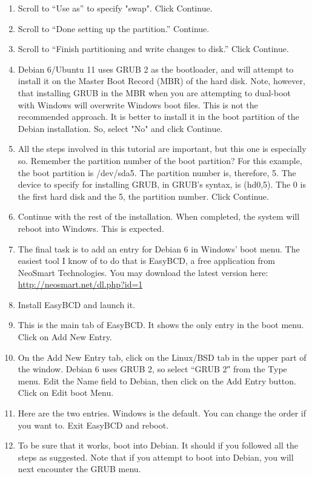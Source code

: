 \documentclass[12pt,notitlepage,onecolumn,oneside,openany]{memoir}
\begin{document}
\begin{enumerate}
\item \textsf{Scroll to “Use as” to specify "swap". Click Continue.}

\item \textsf{Scroll to “Done setting up the partition.” Continue.} 

\item \textsf{Scroll to “Finish partitioning and write changes to disk.”  Click Continue.} 

\item \textsf{Debian 6/Ubuntu 11 uses GRUB 2 as the bootloader, and will attempt to install it on the Master Boot Record (MBR) of the hard disk. Note, however, that installing GRUB in the MBR when you are attempting to dual-boot with Windows will overwrite Windows boot files. This is not the recommended approach. It is better to install it in the boot partition of the Debian installation. So, select "No" and click Continue.} 

\item \textsf{All the steps involved in this tutorial are important, but this one is especially so. Remember the partition number of the boot partition? For this example, the boot partition is /dev/sda5. The partition number is, therefore, 5. The device to specify for installing GRUB, in GRUB’s syntax, is (hd0,5). The 0 is the first hard disk and the 5, the partition number. Click Continue.}

\item \textsf{Continue with the rest of the installation. When completed, the system will reboot into Windows. This is expected.}
 
\item \textsf{The final task is to add an entry for Debian 6 in Windows’ boot menu. The easiest tool I know of to do that is EasyBCD, a free application from NeoSmart Technologies. You may download the latest version here:} \newline 
      \url{http://neosmart.net/dl.php?id=1} 
      
\item \textsf{Install EasyBCD and launch it.}
 
\item \textsf{This is the main tab of EasyBCD. It shows the only entry in the boot menu. Click on Add New Entry.} 

\item \textsf{On the Add New Entry tab, click on the Linux/BSD tab in the upper part of the window. Debian 6 uses GRUB 2, so select “GRUB 2″ from the Type menu. Edit the Name field to Debian, then click on the Add Entry button. Click on Edit boot Menu.}
 
\item \textsf{Here are the two entries. Windows is the default. You can change the order if you want to. Exit EasyBCD and reboot.} 

\item \textsf{To be sure that it works, boot into Debian. It should if you followed all the steps as suggested. Note that if you attempt to boot into Debian, you will next encounter the GRUB menu.}
\end{enumerate}
\end{document}
